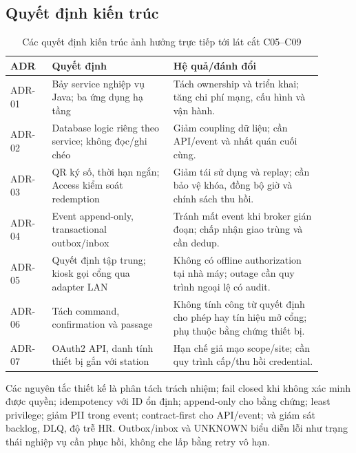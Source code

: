 \subsection{Quyết định kiến trúc}
\label{subsec:adrs}
\begin{table}[htbp]
\centering
\caption{Các quyết định kiến trúc ảnh hưởng trực tiếp tới lát cắt C05--C09}\label{tab:adrs}
\begin{tabular}{|>{\raggedright\arraybackslash}p{0.12\linewidth}|>{\raggedright\arraybackslash}p{0.35\linewidth}|>{\raggedright\arraybackslash}p{0.43\linewidth}|}\hline
\textbf{ADR} & \textbf{Quyết định} & \textbf{Hệ quả/đánh đổi} \\\hline
ADR-01 & Bảy service nghiệp vụ Java; ba ứng dụng hạ tầng & Tách ownership và triển khai; tăng chi phí mạng, cấu hình và vận hành. \\\hline
ADR-02 & Database logic riêng theo service; không đọc/ghi chéo & Giảm coupling dữ liệu; cần API/event và nhất quán cuối cùng. \\\hline
ADR-03 & QR ký số, thời hạn ngắn; Access kiểm soát redemption & Giảm tái sử dụng và replay; cần bảo vệ khóa, đồng bộ giờ và chính sách thu hồi. \\\hline
ADR-04 & Event append-only, transactional outbox/inbox & Tránh mất event khi broker gián đoạn; chấp nhận giao trùng và cần dedup. \\\hline
ADR-05 & Quyết định tập trung; kiosk gọi cổng qua adapter LAN & Không có offline authorization tại nhà máy; outage cần quy trình ngoại lệ có audit. \\\hline
ADR-06 & Tách command, confirmation và passage & Không tính công từ quyết định cho phép hay tín hiệu mở cổng; phụ thuộc bằng chứng thiết bị. \\\hline
ADR-07 & OAuth2 API, danh tính thiết bị gắn với station & Hạn chế giả mạo scope/site; cần quy trình cấp/thu hồi credential. \\\hline
\end{tabular}
\end{table}

Các nguyên tắc thiết kế là phân tách trách nhiệm; fail closed khi không xác minh được quyền; idempotency với ID ổn định; append-only cho bằng chứng; least privilege; giảm PII trong event; contract-first cho API/event; và giám sát backlog, DLQ, độ trễ HR. Outbox/inbox và UNKNOWN biểu diễn lỗi như trạng thái nghiệp vụ cần phục hồi, không che lấp bằng retry vô hạn.

